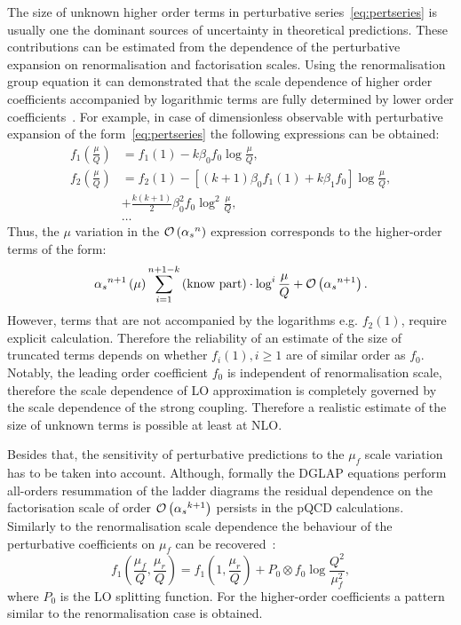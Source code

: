 
The size of unknown higher order terms in perturbative series~\ref{eq:pertseries} is usually one the dominant sources of uncertainty in theoretical predictions. These contributions can be estimated from the dependence of the perturbative expansion on renormalisation and factorisation scales. Using the renormalisation group equation it can demonstrated that the scale dependence of higher order coefficients accompanied by logarithmic terms are fully determined by lower order coefficients~\cite{DataAnalysisBehnke}. For example, in case of dimensionless observable with perturbative expansion of the form~\ref{eq:pertseries} the following expressions can be obtained:
\begin{align}
	f_1\left(\frac{\mu}{Q}\right) &= f_1\left(1\right) - k\beta_0f_0\log{\frac{\mu}{Q}}, \\
	f_2\left(\frac{\mu}{Q}\right) &= f_2\left(1\right) - \left[\left(k+1\right)\beta_0f_1\left(1\right) + k\beta_1f_0\right]\log{\frac{\mu}{Q}}, \\
																						&+ \frac{k\left(k+1\right)}{2}\beta_0^2f_0\log^2{\frac{\mu}{Q}},\\
																						& \ldots 
\end{align}
Thus, the $\mu$ variation in the $\mathcal{O}\left(\mbox{$\alpha_{s}$}^n\right)$ expression corresponds to the higher-order terms of the form:
\begin{equation}
 \mbox{$\alpha_{s}$}^{n+1}\left(\mu\right) \sum_{i=1}^{n+1-k}{\text{(know part)}\cdot\log^i{\frac{\mu}{Q}}} + \mathcal{O}\left(\mbox{$\alpha_{s}$}^{n+1}\right).
\label{eq:scalevariationerror}
\end{equation}
However, terms that are not accompanied by the logarithms e.g. $f_2\left(1\right)$, require explicit calculation. Therefore the reliability of an estimate of the size of truncated terms depends on whether $f_i\left(1\right), i \ge 1$ are of similar order as $f_0$. Notably,
the leading order coefficient $f_0$ is independent of renormalisation scale, therefore the scale dependence of LO approximation is completely governed by the scale dependence of the strong coupling. Therefore a realistic estimate of the size of unknown terms is possible at least at NLO.

Besides that, the sensitivity of perturbative predictions to the $\mu_f$ scale variation has to be taken into account. Although, formally the DGLAP equations perform all-orders resummation of the ladder diagrams the residual dependence on the factorisation scale of order $\mathcal{O}\left(\mbox{$\alpha_{s}$}^{k+1}\right)$ persists in the pQCD calculations. Similarly to the renormalisation scale dependence the behaviour of the perturbative coefficients on $\mu_f$ can be recovered~\cite{markusdiehl}:
\begin{equation}
 f_1\left(\frac{\mu_f}{Q},\frac{\mu_r}{Q}\right) = f_1\left(1,\frac{\mu_r}{Q}\right) + P_0 \otimes f_0 \log{\frac{Q^2}{\mu_f^2}},
\label{eq:factorisationscaledep}
\end{equation}
where $P_0$ is the LO splitting function. For the higher-order coefficients a pattern similar to the renormalisation case is obtained.

